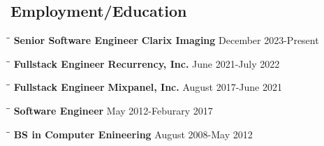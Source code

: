 \documentclass{res}
\begin{document}
 
\thispagestyle{empty} %
\address{\url{https://github.com/ksiondag}\\
  ksiondag846@gmail.com\\
  (520) 329-5081\\
  Chicago, IL}


\begin{resume}

  \section{Employment/Education}
  \vspace{-0.1in}
  \begin{tabbing}
    \hspace{2.2in}\= \hspace{2.2in}\= \kill
    {\bf Senior Software Engineer} \> {\bf Clarix Imaging}     \>December 2023-Present
  \end{tabbing}\vspace{-5pt}
  
  \vspace{-20pt}\begin{tabbing}
    \hspace{2.2in}\= \hspace{2.2in}\= \kill
    {\bf Fullstack Engineer} \> {\bf Recurrency, Inc.}     \>June 2021-July 2022
  \end{tabbing}\vspace{-5pt}
  
  \vspace{-20pt}\begin{tabbing}
    \hspace{2.2in}\= \hspace{2.2in}\= \kill
    {\bf Fullstack Engineer} \> {\bf Mixpanel, Inc.}     \>August 2017-June 2021
  \end{tabbing}\vspace{-5pt}
  
  \vspace{-20pt}\begin{tabbing}
    \hspace{2.2in}\= \hspace{2.2in}\= \kill
    {\bf Software Engineer}  \> May 2012-Feburary 2017
  \end{tabbing}\vspace{-5pt}
  
  \vspace{-20pt}\begin{tabbing}
    \hspace{2.2in}\= \hspace{2.2in}\= \kill
    {\bf BS in Computer Enineering}  \> August 2008-May 2012\\
  \end{tabbing}\vspace{-5pt}
  

\end{resume}
\end{document}

